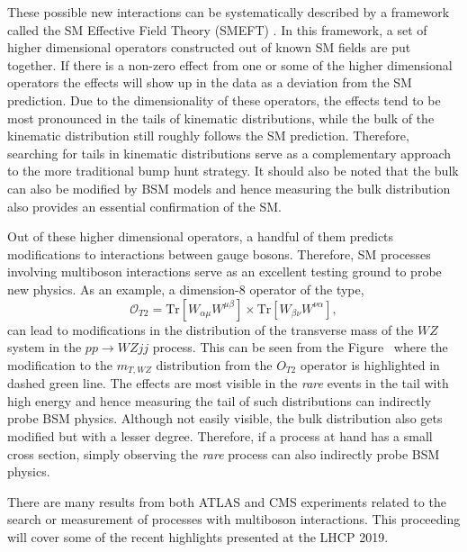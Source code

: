 \documentclass[10pt]{article}
\begin{document}
These possible new interactions can be systematically described by a framework called the SM Effective Field Theory (SMEFT) \cite{}.
In this framework, a set of higher dimensional operators constructed out of known SM fields are put together.
If there is a non-zero effect from one or some of the higher dimensional operators the effects will show up in the data as a deviation from the SM prediction.
Due to the dimensionality of these operators, the effects tend to be most pronounced in the tails of kinematic distributions, while the bulk of the kinematic distribution still roughly follows the SM prediction.
Therefore, searching for tails in kinematic distributions serve as a complementary approach to the more traditional bump hunt strategy.
It should also be noted that the bulk can also be modified by BSM models and hence measuring the bulk distribution also provides an essential confirmation of the SM.

Out of these higher dimensional operators, a handful of them predicts modifications to interactions between gauge bosons.
Therefore, SM processes involving multiboson interactions serve as an excellent testing ground to probe new physics.
As an example, a dimension-8 operator of the type,
\begin{equation}
    \mathcal{O}_{T2} = \textrm{Tr}\left[W_{\alpha\mu}W^{\mu\beta}\right]\times\textrm{Tr}\left[W_{\beta\nu}W^{\nu\alpha}\right],
\end{equation}
can lead to modifications in the distribution of the transverse mass of the $WZ$ system in the $pp\to WZjj$ process.
This can be seen from the Figure~ where the modification to the $m_{T,WZ}$ distribution from the $O_{T2}$ operator is highlighted in dashed green line.
The effects are most visible in the \emph{rare} events in the tail with high energy and hence measuring the tail of such distributions can indirectly probe BSM physics.
Although not easily visible, the bulk distribution also gets modified but with a lesser degree.
Therefore, if a process at hand has a small cross section, simply observing the \emph{rare} process can also indirectly probe BSM physics.

There are many results from both ATLAS and CMS experiments related to the search or measurement of processes with multiboson interactions.
This proceeding will cover some of the recent highlights presented at the LHCP 2019.
\end{document}
